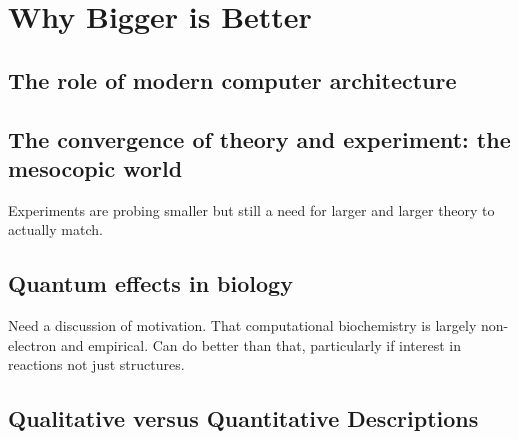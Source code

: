 \chapter{Why Bigger is Better}

\section{The role of modern computer architecture}

\section{The convergence of theory and experiment: the mesocopic world}
Experiments are probing smaller but still a need for larger and larger theory to actually match.

\section{Quantum effects in biology}
Need a discussion of motivation.  That computational biochemistry   is largely non-electron and empirical.  Can do better than that, particularly if interest in reactions not just structures.


\section{Qualitative versus Quantitative Descriptions}
